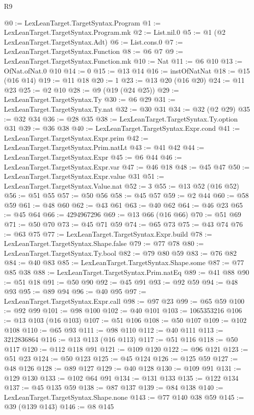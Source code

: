 \begin{lexlean}{R9}
\begin{coremodule}
@0 := LexLeanTarget.TargetSyntax.Program
@1 := LexLeanTarget.TargetSyntax.Program.mk
@2 := List.nil.{0}
@5 := @1 (@2 LexLeanTarget.TargetSyntax.Adt)
@6 := List.cons.{0}
@7 := LexLeanTarget.TargetSyntax.Function
@8 := @6 @7
@9 := LexLeanTarget.TargetSyntax.Function.mk
@10 := Nat
@11 := @6 @10
@13 := OfNat.ofNat.{0} @10
@14 := 0
@15 := @13 @14
@16 := instOfNatNat
@18 := @15 (@16 @14)
@19 := @11 @18
@20 := 1
@23 := @13 @20 (@16 @20)
@24 := @11 @23
@25 := @2 @10
@28 := @9 (@19 (@24 @25))
@29 := LexLeanTarget.TargetSyntax.Ty
@30 := @6 @29
@31 := LexLeanTarget.TargetSyntax.Ty.nat
@32 := @30 @31
@34 := @32 (@2 @29)
@35 := @32 @34
@36 := @28 @35
@38 := LexLeanTarget.TargetSyntax.Ty.option @31
@39 := @36 @38
@40 := LexLeanTarget.TargetSyntax.Expr.cond
@41 := LexLeanTarget.TargetSyntax.Expr.prim
@42 := LexLeanTarget.TargetSyntax.Prim.natLt
@43 := @41 @42
@44 := LexLeanTarget.TargetSyntax.Expr
@45 := @6 @44
@46 := LexLeanTarget.TargetSyntax.Expr.var
@47 := @46 @18
@48 := @45 @47
@50 := LexLeanTarget.TargetSyntax.Expr.value @31
@51 := LexLeanTarget.TargetSyntax.Value.nat
@52 := 3
@55 := @13 @52 (@16 @52)
@56 := @51 @55
@57 := @50 @56
@58 := @45 @57
@59 := @2 @44
@60 := @58 @59
@61 := @48 @60
@62 := @43 @61
@63 := @40 @62
@64 := @46 @23
@65 := @45 @64
@66 := 4294967296
@69 := @13 @66 (@16 @66)
@70 := @51 @69
@71 := @50 @70
@73 := @45 @71 @59
@74 := @65 @73
@75 := @43 @74
@76 := @63 @75
@77 := LexLeanTarget.TargetSyntax.Expr.build
@78 := LexLeanTarget.TargetSyntax.Shape.false
@79 := @77 @78
@80 := LexLeanTarget.TargetSyntax.Ty.bool
@82 := @79 @80 @59
@83 := @76 @82
@84 := @40 @83
@85 := LexLeanTarget.TargetSyntax.Shape.some
@87 := @77 @85 @38
@88 := LexLeanTarget.TargetSyntax.Prim.natEq
@89 := @41 @88
@90 := @51 @18
@91 := @50 @90
@92 := @45 @91
@93 := @92 @59
@94 := @48 @93
@95 := @89 @94
@96 := @40 @95
@97 := LexLeanTarget.TargetSyntax.Expr.call
@98 := @97 @23
@99 := @65 @59
@100 := @92 @99
@101 := @98 @100
@102 := @40 @101
@103 := 1065353216
@106 := @13 @103 (@16 @103)
@107 := @51 @106
@108 := @50 @107
@109 := @102 @108
@110 := @65 @93
@111 := @98 @110
@112 := @40 @111
@113 := 3212836864
@116 := @13 @113 (@16 @113)
@117 := @51 @116
@118 := @50 @117
@120 := @112 @118 @91
@121 := @109 @120
@122 := @96 @121
@123 := @51 @23
@124 := @50 @123
@125 := @45 @124
@126 := @125 @59
@127 := @48 @126
@128 := @89 @127
@129 := @40 @128
@130 := @109 @91
@131 := @129 @130
@133 := @102 @64 @91
@134 := @131 @133
@135 := @122 @134
@137 := @45 @135 @59
@138 := @87 @137
@139 := @84 @138
@140 := LexLeanTarget.TargetSyntax.Shape.none
@143 := @77 @140 @38 @59
@145 := @39 (@139 @143)
@146 := @8 @145

\end{coremodule}
\end{lexlean}
